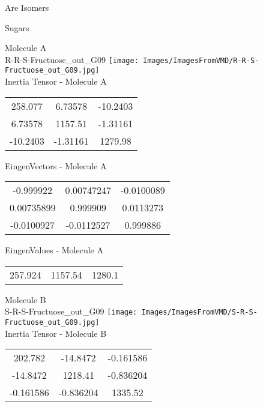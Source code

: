 \begin{center}
\vtab
\vtab
\textcolor{NavyBlue}{\Large Are Isomers}
\end{center}
\newpage

\vtab[-2cm]
\begin{center}
{\large Sugars}
\end{center}
\begin{multicols}{2}
\begin{center}
Molecule A \\ 
R-R-S-Fructuose\_out\_G09
\texttt{[image: Images/ImagesFromVMD/R-R-S-Fructuose\_out\_G09.jpg]}
\\
Inertia Tensor - Molecule A \\
\vtab
\begin{tabular}{|c c c|}
258.077	 & 	6.73578	 & 	-10.2403	 \\
6.73578	 & 	1157.51	 & 	-1.31161	 \\
-10.2403	 & 	-1.31161	 & 	1279.98
\end{tabular}

\vtab
 EingenVectors - Molecule A     \\
\vtab
\begin{tabular}{|c c c|}
-0.999922	 & 	0.00747247	 & 	-0.0100089	 \\
0.00735899	 & 	0.999909	 & 	0.0113273	 \\
-0.0100927	 & 	-0.0112527	 & 	0.999886
\end{tabular}

\vtab
 EingenValues - Molecule A     \\
\vtab
\begin{tabular}{|c c c|}
257.924	 & 	1157.54	 & 	1280.1
\end{tabular}
\columnbreak

Molecule B \\ 
S-R-S-Fructuose\_out\_G09
\texttt{[image: Images/ImagesFromVMD/S-R-S-Fructuose\_out\_G09.jpg]}
\\
Inertia Tensor - Molecule B \\
\vtab
\begin{tabular}{|c c c|}
202.782	 & 	-14.8472	 & 	-0.161586	 \\
-14.8472	 & 	1218.41	 & 	-0.836204	 \\
-0.161586	 & 	-0.836204	 & 	1335.52
\end{tabular}


\end{center}
\end{multicols}
